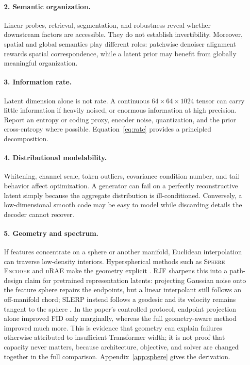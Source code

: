 \documentclass{article}
\newcommand{\method}[1]{\textsc{#1}}
\begin{document}
\paragraph{2. Semantic organization.}
Linear probes, retrieval, segmentation, and robustness reveal whether downstream factors are accessible. They do not establish invertibility. Moreover, spatial and global semantics play different roles: patchwise denoiser alignment rewards spatial correspondence, while a latent prior may benefit from globally meaningful organization.

\paragraph{3. Information rate.}
Latent dimension alone is not rate. A continuous \(64\times64\times1024\) tensor can carry little information if heavily noised, or enormous information at high precision. Report an entropy or coding proxy, encoder noise, quantization, and the prior cross-entropy where possible. Equation~\eqref{eq:rate} provides a principled decomposition.

\paragraph{4. Distributional modelability.}
Whitening, channel scale, token outliers, covariance condition number, and tail behavior affect optimization. A generator can fail on a perfectly reconstructive latent simply because the aggregate distribution is ill-conditioned. Conversely, a low-dimensional smooth code may be easy to model while discarding details the decoder cannot recover.

\paragraph{5. Geometry and spectrum.}
If features concentrate on a sphere or another manifold, Euclidean interpolation can traverse low-density interiors. Hyperspherical methods such as \method{Sphere Encoder} and \method{dRAE} make the geometry explicit \citep{yue2026sphere,ma2026drae}. \method{RJF} sharpens this into a path-design claim for pretrained representation latents: projecting Gaussian noise onto the feature sphere repairs the endpoints, but a linear interpolant still follows an off-manifold chord; SLERP instead follows a geodesic and its velocity remains tangent to the sphere \citep{kumar2026rjf}. In the paper's controlled protocol, endpoint projection alone improved FID only marginally, whereas the full geometry-aware method improved much more. This is evidence that geometry can explain failures otherwise attributed to insufficient Transformer width; it is not proof that capacity never matters, because architecture, objective, and solver are changed together in the full comparison. Appendix~\ref{app:sphere} gives the derivation.
\end{document}
